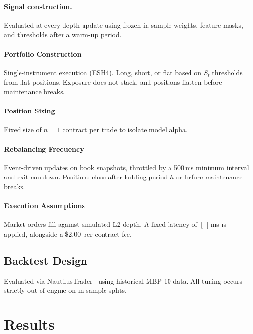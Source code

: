 \documentclass[11pt,letterpaper]{article}
\begin{document}
\paragraph{Signal construction.} Evaluated at every depth update using frozen in-sample weights, feature masks, and thresholds after a warm-up period.
 
\paragraph{Portfolio Construction}
Single-instrument execution (ESH4). Long, short, or flat based on $S_t$ thresholds from flat positions. Exposure does not stack, and positions flatten before maintenance breaks.
 
\paragraph{Position Sizing}
Fixed size of $n=1$ contract per trade to isolate model alpha.
 
\paragraph{Rebalancing Frequency} Event-driven updates on book snapshots, throttled by a 500\,ms minimum interval and exit cooldown. Positions close after holding period $h$ or before maintenance breaks.
 
\paragraph{Execution Assumptions}
Market orders fill against simulated L2 depth. A fixed latency of $[\,]$\,ms is applied, alongside a \$2.00 per-contract fee.
 
\subsection{Backtest Design}
Evaluated via NautilusTrader~\cite{nautilus} using historical MBP-10 data. All tuning occurs strictly out-of-engine on in-sample splits.
 
\section{Results}
\end{document}
